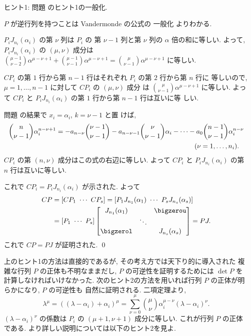 \documentclass[12pt,twoside]{jarticle}
\begin{document}
\noindent
ヒント1: 問題  のヒント1の一般化.

$P$ が逆行列を持つことは Vandermonde の公式の
一般化  よりわかる.

$P_iJ_{n_i}(\alpha_i)$ の第 $\nu$ 列は $P_i$ の
第 $\nu-1$ 列と第 $\nu$ 列の $\alpha$ 倍の和に等しい.
よって, $P_iJ_{n_i}(\alpha_i)$ の $(\mu,\nu)$ 成分は $
  \binom{\mu-1}{\nu-2}\alpha^{\mu-\nu+1} 
+ \binom{\mu-1}{\nu-1}\alpha^{\mu-\nu+1}
= \binom{\mu}{\nu-1}\alpha^{\mu-\nu+1}$ に等しい.

$CP_i$ の第 $1$ 行から第 $n-1$ 行はそれぞれ $P_i$ の第 $2$ 行から第 $n$ 行に
等しいので, $\mu=1,\dots,n-1$ に対して $CP_i$ の $(\mu,\nu)$ 成分
は $\binom{\mu}{\nu-1}\alpha^{\mu-\nu+1}$ に等しい.
よって $CP_i$ と $P_iJ_{n_i}(\alpha_i)$ の第 $1$ 行から第 $n-1$ 行は互いに等
しい.

問題  の結果で $x_i=\alpha_i$, $k=\nu-1$ と置
けば, 
\begin{align*}
  &
  \binom{n}{\nu-1}\alpha_i^{n-\nu+1} 
  =
  - a_{n-\nu}\binom{\nu-1}{\nu-1}
  - a_{n-\nu-1}\binom{\nu}{\nu-1}\alpha_i
  - \cdots 
  - a_0\binom{n-1}{\nu-1}\alpha_i^{n-\nu}
  \\ &
  \hphantom{
  \binom{n}{\nu-1}\alpha_i^{n-\nu+1} 
  =
  - a_{n-\nu}\binom{\nu-1}{\nu-1}
  - a_{n-\nu-1}\binom{\nu}{\nu-1}\alpha_i
  - \cdots 
  -
  }
  (\nu=1,\dots,n_i).
\end{align*}
$CP_i$ の第 $(n,\nu)$ 成分はこの式の右辺に等しい. 
よって $CP_i$ と $P_iJ_{n_i}(\alpha_i)$ の第 $n$ 行は互いに等しい.

これで $CP_i=P_iJ_{n_i}(\alpha_i)$ が示された.  よって
\begin{align*}
  CP
  &
  =[CP_1\ \cdots\ CP_s]
  =[P_1J_{n_1}(\alpha_1)\ \cdots\ P_sJ_{n_s}(\alpha_s)]
  \\ &
  =[P_1\ \cdots\ P_s]
  \begin{bmatrix}
    J_{n_1}(\alpha_1) &        & \bigzerou \\
                      & \ddots & \\
    \bigzerol         &        & J_{n_s}(\alpha_s) \\
  \end{bmatrix}
  = PJ.
\end{align*}
これで $CP=PJ$ が証明された.
\qed

\bigskip

上のヒント1の方法は直接的であるが, その考え方では天下り的に導入された
複雑な行列 $P$ の正体も不明なままだし,  
$P$ の可逆性を証明するためには $\det P$ を計算しなければいけなかった.
次のヒント2の方法を用いれば行列 $P$ の正体が明らかになり, $P$ の可逆性も
自然に証明される.  二項定理より, 
\begin{equation*}
  \lambda^\mu 
  = ((\lambda-\alpha_i) + \alpha_i)^\mu
  = \sum_{\nu=0}^{\mu} 
    \binom{\mu}{\nu} \alpha_i^{\mu-\nu} (\lambda-\alpha_i)^\nu.
\end{equation*}
$(\lambda-\alpha_i)^\nu$ の係数は $P_i$ の $(\mu+1,\nu+1)$ 成分に等しい.
これが行列 $P$ の正体である.  より詳しい説明については以下のヒント2を見よ.
\end{document}
